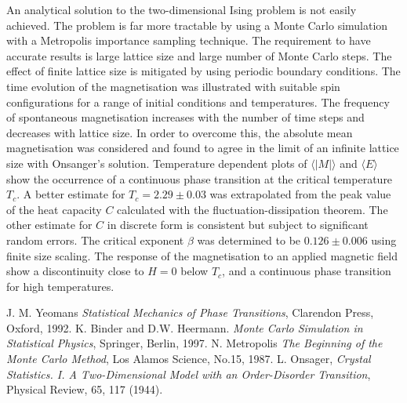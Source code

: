 \documentclass[a4paper]{article}
\begin{document}
An analytical solution to the two-dimensional Ising problem is not easily achieved. The problem is far more tractable by using a Monte Carlo simulation with a Metropolis importance sampling technique. The requirement to have accurate results is large lattice size and large number of Monte Carlo steps. The effect of finite lattice size is mitigated by using periodic boundary conditions. The time evolution of the magnetisation was illustrated with suitable spin configurations for a range of initial conditions and temperatures. The frequency of spontaneous magnetisation increases with the number of time steps and decreases with lattice size. In order to overcome this, the absolute mean magnetisation was considered and found to agree in the limit of an infinite lattice size with Onsanger's solution. Temperature dependent plots of $\langle |M| \rangle$ and $\langle E \rangle$ show the occurrence of a continuous phase transition at the critical temperature $T_c$. A better estimate for $T_c = 2.29 \pm 0.03$ was extrapolated from the peak value of the heat capacity $C$ calculated with the fluctuation-dissipation theorem. The other estimate for $C$ in discrete form is consistent but subject to significant random errors. The critical exponent $\beta$ was determined to be $0.126 \pm 0.006$ using finite size scaling. The response of the magnetisation to an applied magnetic field show a discontinuity close to $H = 0$ below $T_c$, and a continuous phase transition for high temperatures. 

\begin{thebibliography}{3}

 J. M. Yeomans \emph{Statistical Mechanics of Phase Transitions}, Clarendon Press, Oxford, 1992.
  K. Binder and D.W. Heermann. \emph{Monte Carlo Simulation in Statistical Physics}, Springer, Berlin, 1997.
  N. Metropolis \emph{The Beginning of the Monte Carlo Method}, Los Alamos Science, No.15, 1987. 
  L. Onsager, \emph{Crystal Statistics. I. A Two-Dimensional Model with an Order-Disorder Transition}, Physical Review, 65, 117 (1944).
 
\end{thebibliography}

\appendix

\newpage
\end{document}

